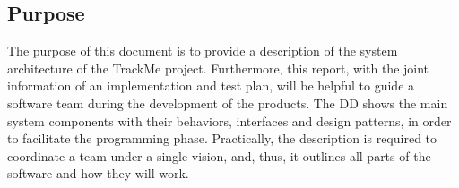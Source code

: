 \subsection{Purpose}
The purpose of this document is to provide a description of the system architecture of the TrackMe project. 
Furthermore, this report, with the joint information of an implementation and test plan, will be helpful to guide a software team
during the development of the products. 
The DD shows the main system components with their behaviors, interfaces and design patterns, in order to facilitate the programming phase.
Practically, the description is required to coordinate a team under a single vision, and, thus, it outlines all parts of the software and how
they will work.